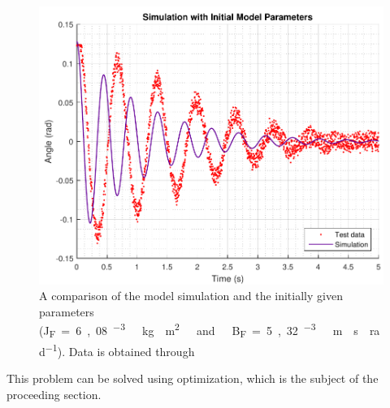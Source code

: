 \begin{figure}[H] 
	\centering
	\includegraphics[width=.6\textwidth]{figures/InitialModelParameterCompare}
	\caption{A comparison of the model simulation and the initially given parameters (\si{J_F=6,08 ^{-3}\ kg \cdot m^2\ and\ B_F=5,32 ^{-3}\ m \cdot s \cdot rad^{-1}}). Data is obtained through }
	\label{InitialModelParameterCompare}
\end{figure}
%
This problem can be solved using optimization, which is the subject of the proceeding section.